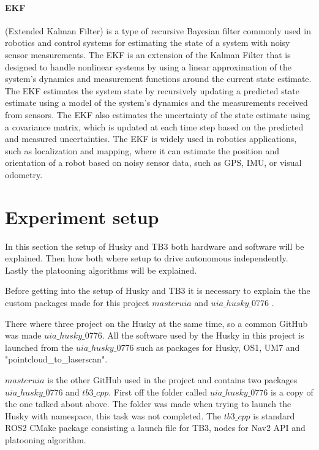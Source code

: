 \paragraph{EKF} (Extended Kalman Filter) is a type of recursive Bayesian filter commonly used in robotics and control systems for estimating the state of a system with noisy sensor measurements. The EKF is an extension of the Kalman Filter that is designed to handle nonlinear systems by using a linear approximation of the system's dynamics and measurement functions around the current state estimate. The EKF estimates the system state by recursively updating a predicted state estimate using a model of the system's dynamics and the measurements received from sensors. The EKF also estimates the uncertainty of the state estimate using a covariance matrix, which is updated at each time step based on the predicted and measured uncertainties. The EKF is widely used in robotics applications, such as localization and mapping, where it can estimate the position and orientation of a robot based on noisy sensor data, such as GPS, IMU, or visual odometry.


\section{Experiment setup}
In this section the setup of Husky and TB3 both hardware and software will be explained. Then how both where setup to drive autonomous independently. Lastly the platooning algorithms will be explained. 

Before getting into the setup of Husky and TB3 it is necessary to explain the the custom packages made for this project $masteruia$ \cite{masteruia} and $uia\_husky\_0776$ \cite{uiahusky}. 

There where three project on the Husky at the same time, so a common GitHub was made $uia\_husky\_0776$. All the software used by the Husky in this project is launched from the $uia\_husky\_0776$ such as packages for Husky, OS1, UM7 and "pointcloud\_to\_laserscan".

$masteruia$ is the other GitHub used in the project and contains two packages $uia\_husky\_0776$ and $tb3\_cpp$.
First off the folder called $uia\_husky\_0776$ is a copy of the one talked about above. The folder was made when trying to launch the Husky with namespace, this task was not completed. 
The $tb3\_cpp$ is standard ROS2 CMake package consisting a launch file for TB3, nodes for Nav2 API and platooning algorithm. 
                      
